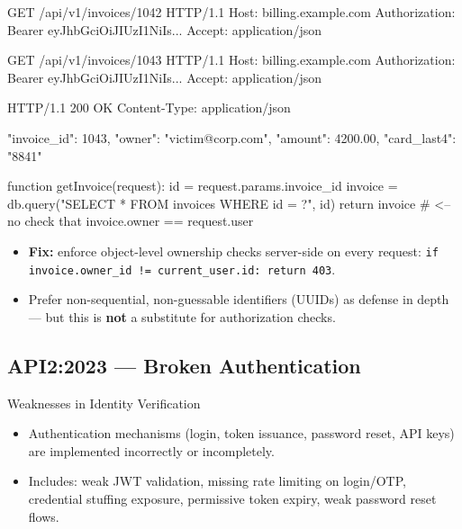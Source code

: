 \documentclass[11pt]{article}
\begin{document}
\begin{httpbox}
GET /api/v1/invoices/1042 HTTP/1.1
Host: billing.example.com
Authorization: Bearer eyJhbGciOiJIUzI1NiIs...
Accept: application/json
\end{httpbox}

\begin{httpbox}
GET /api/v1/invoices/1043 HTTP/1.1
Host: billing.example.com
Authorization: Bearer eyJhbGciOiJIUzI1NiIs...
Accept: application/json

HTTP/1.1 200 OK
Content-Type: application/json

{ "invoice_id": 1043, "owner": "victim@corp.com",
  "amount": 4200.00, "card_last4": "8841" }
\end{httpbox}

\begin{pseudobox}
function getInvoice(request):
    id = request.params.invoice_id
    invoice = db.query("SELECT * FROM invoices WHERE id = ?", id)
    return invoice   # <-- no check that invoice.owner == request.user
\end{pseudobox}

\begin{itemize}
  \item \textbf{Fix:} enforce object-level ownership checks server-side on every request:
  \texttt{if invoice.owner\_id != current\_user.id: return 403}.
  \item Prefer non-sequential, non-guessable identifiers (UUIDs) as defense in depth --- but this is \textbf{not} a substitute for authorization checks.
\end{itemize}

\subsection{API2:2023 --- Broken Authentication}
\begin{vulnbox}{Weaknesses in Identity Verification}
\begin{itemize}
  \item Authentication mechanisms (login, token issuance, password reset, API keys) are implemented incorrectly or incompletely.
  \item Includes: weak JWT validation, missing rate limiting on login/OTP, credential stuffing exposure, permissive token expiry, weak password reset flows.
\end{itemize}
\end{vulnbox}
\end{document}
